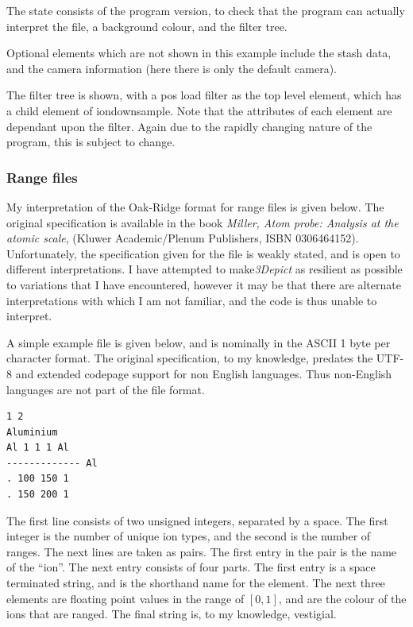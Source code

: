 \documentclass[10pt]{article}
\begin{document}
The state consists of the program version, to check that the program can actually interpret the file, a background colour, and the filter tree. 

Optional elements which are not shown in this example include the stash data, and the camera information (here there is only the default camera).

The filter tree is shown, with a pos load filter as the top level element, which has a child element of iondownsample. Note that the attributes of each element are dependant upon the filter. Again due to the rapidly changing nature of the program, this is subject to change.

\subsubsection{Range files}

My interpretation of the Oak-Ridge format for range files is given below. The original specification is available in the book \textit{Miller, Atom probe: Analysis at the atomic scale}, (Kluwer Academic/Plenum Publishers, ISBN 0306464152). Unfortunately, the specification given for the file is weakly stated, and is open to different interpretations. I have attempted to make\emph{3Depict} as resilient as possible to variations that I have encountered, however it may be that there are alternate interpretations with which I am not familiar, and the code is thus unable to interpret.

A simple example file is given below, and is nominally in the ASCII 1 byte per character format. The original specification, to my knowledge, predates the UTF-8 and extended codepage support for non English languages. Thus non-English languages are not part of the file format. 

\begin{verbatim}
1 2
Aluminium
Al 1 1 1 Al
------------- Al
. 100 150 1
. 150 200 1
\end{verbatim}

The first line consists of two unsigned integers, separated by a space. The first integer is the number of unique ion types, and the second is the number of ranges. The next lines are taken as pairs. The first entry in the pair is
the name of the ``ion''. The next entry consists of four parts. The first entry is a space terminated string, and is the shorthand name for the element. The next three elements are floating point values in the range of $[0,1]$, and are the colour of the ions that are ranged. The final string is, to my knowledge, vestigial. 
\end{document}
